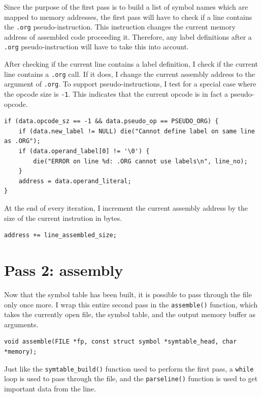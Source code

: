 \documentclass[a4paper]{report}
\begin{document}
Since the purpose of the first pass is to build a list of symbol names which are
mapped to memory addresses, the first pass will have to check if a line contains
the \texttt{.org} pseudo-instruction. This instruction changes the current
memory address of assembled code proceeding it. Therefore, any label definitions
after a \texttt{.org} pseudo-instruction will have to take this into account.

After checking if the current line contains a label definition, I check if the
current line contains a \texttt{.org} call. If it does, I change the current
assembly address to the argument of \texttt{.org}. To support
pseudo-instructions, I test for a special case where the opcode size is
\texttt{-1}. This indicates that the current opcode is in fact a pseudo-opcode.

\begin{lstlisting}
if (data.opcode_sz == -1 && data.pseudo_op == PSEUDO_ORG) {
	if (data.new_label != NULL) die("Cannot define label on same line as .ORG");
	if (data.operand_label[0] != '\0') {
		die("ERROR on line %d: .ORG cannot use labels\n", line_no);
	}
	address = data.operand_literal;
}
\end{lstlisting}

At the end of every iteration, I increment the current assembly address by the
size of the current instrution in bytes.

\begin{lstlisting}
address += line_assembled_size;
\end{lstlisting}

\section{Pass 2: assembly}

Now that the symbol table has been built, it is possible to pass through the
file only once more. I wrap this entire second pass in the \texttt{assemble()}
function, which takes the currently open file, the symbol table, and the output
memory buffer as arguments.

\begin{lstlisting}
void assemble(FILE *fp, const struct symbol *symtable_head, char *memory);
\end{lstlisting}

Just like the \texttt{symtable\_build()} function used to perform the first
pass, a \texttt{while} loop is used to pass through the file, and the
\texttt{parseline()} function is used to get important data from the line.
\end{document}
